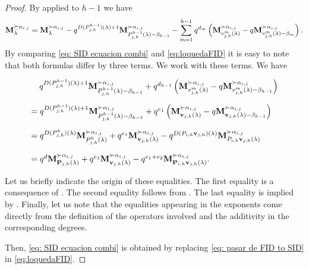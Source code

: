 \begin{proof}
By  applied to $ h-1$ we have
\begin{equation} \label{eq:loquedaFID}
     \mathbf{M}_{\lambda}^{\succeq \alpha_{i,j}} = \mathbf{M}_{\lambda}^{\succ \alpha_{i,j}} - q^{D(P^{h-1}_{j,h})(\lambda)+1} \mathbf{M}_{P^{h-1}_{j,h}(\lambda) - \beta_{h-1}}^{\succ \alpha_{i,j}} - \displaystyle\sum_{m=1}^{h-1} q^{d_m} \left( \mathbf{M}_{v^{m}_{j,h}(\lambda)}^{\succ \alpha_{i,j}} - q\mathbf{M}_{v^{m}_{j,h}(\lambda)-\beta_m}^{\succ \alpha_{i,j}}\right).
\end{equation}
By comparing \eqref{eq: SID ecuacion combi} and \eqref{eq:loquedaFID} it is easy to note that both formulas differ by three terms. 
We work with these terms. 
We have

\begin{equation}\label{eq: pasar de FID to SID}
\begin{array}{l}
      \quad   q^{D(P^{h-1}_{j,h})(\lambda)+1} \mathbf{M}_{P^{h-1}_{j,h}(\lambda) - \beta_{h-1}}^{\succ \alpha_{i,j}}
     + q^{d_{h-1}} \left( \mathbf{M}_{v^{m}_{j,h}(\lambda)}^{\succ \alpha_{i,j}} - q\mathbf{M}_{v^{m}_{j,h}(\lambda)-\beta_{h-1}}^{\succ \alpha_{i,j}} \right)    \\[15pt]
     = q^{D(P^{h-1}_{j,h})(\lambda)+1} \mathbf{M}_{P^{h-1}_{j,h}(\lambda) - \beta_{h-1}}^{\succ \alpha_{i,j}}
     + q^{e_1} \left( \mathbf{M}_{\mathbf{v}_{j,h}(\lambda)}^{\succ \alpha_{i,j}} - q\mathbf{M}_{\mathbf{v}_{j,h}(\lambda)-\beta_{h-1}}^{\succ \alpha_{i,j}} \right)   \\[15pt]
     = q^{D(P^{h}_{j,h})(\lambda)} \mathbf{M}_{P^{h}_{j,h}(\lambda)}^{\succ \alpha_{i,j}}
     + q^{e_1} \mathbf{M}_{\mathbf{v}_{j,h}(\lambda)}^{\succ \alpha_{i,j}} - q^{D(P_{i,h}\mathbf{v}_{j,h})(\lambda)}\mathbf{M}_{P_{i,h}\mathbf{v}_{j,h}(\lambda)}^{\succ \alpha_{i,j}}     \\[15pt]
     = q^{d} \mathbf{M}_{\mathbf{P}_{j,h}(\lambda)}^{\succ \alpha_{i,j}}
     + q^{e_1} \mathbf{M}_{\mathbf{v}_{j,h}(\lambda)}^{\succ \alpha_{i,j}} - q^{e_1+e_2}\mathbf{M}_{\mathbf{P}_{i,h}\mathbf{v}_{j,h}(\lambda)}^{\succ \alpha_{i,j}}  . 
\end{array}
\end{equation}


Let us briefly indicate the origin of these equalities.
The first equality is a consequence of .
The second equality follows from .
The last equality is implied by .
Finally, let us note that the equalities appearing in the exponents come directly from the definition of the operators involved and the additivity in the  corresponding degrees.

Then, \eqref{eq: SID ecuacion combi} is obtained by replacing \eqref{eq: pasar de FID to SID} in \eqref{eq:loquedaFID}.
\end{proof}


